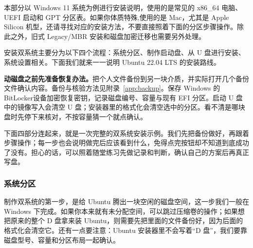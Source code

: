 本部分以 Windows 11 系统为例进行安装说明，使用的是常见的 x86\_64 电脑、UEFI 启动和 GPT 分区表。如果你体质特殊,使用的是 Mac，尤其是 Apple Silicon 机型，还请寻找对应的安装方法，不要直接照着下面的分区步骤操作。除此之外，旧式 Legacy/MBR 安装和磁盘加密迁移也需要另外处理。

安装双系统主要分为以下四个流程：系统分区、制作启动盘、从 U 盘进行安装、系统设置相关。下面我们就来一一说明 Ubuntu 22.04 LTS 的安装路线。

\begin{note}
\textbf{动磁盘之前先准备恢复办法。}把个人文件备份到另一块介质，并实际打开几个备份文件确认内容。备份与核验方法见附录~\ref{app:backup}。保存 Windows 的 BitLocker设备加密恢复密钥，记录磁盘编号、容量与现有 EFI 分区。启动 U 盘中的镜像写入会清空 U 盘；安装器里的格式化会清空选中的分区。看不清是哪块盘时先停下来核对，不按容量猜一个就点确认。
\end{note}

下面四部分连起来，就是一次完整的双系统安装示例。我们先把备份做好，再跟着步骤操作；每一步也会说明做完后应该看到什么，免得点完按钮却不知道到底成功了没有。担心的话，可以照着随堂练习先做记录和判断，确认自己的方案后再真正写盘。

\subsubsection{系统分区}
\label{sec:ubuntu-partition}
制作双系统的第一步，是给 Ubuntu 腾出一块空闲的磁盘空间，这一步我们一般在 Windows 下完成。如果你本来就有未分配空间，可以跳过压缩卷的操作；如果想把原来的整个 D 盘拿来装 Ubuntu，则需要先把里面的文件备份好，因为后面的格式化会清空它。还有一点要注意：Ubuntu 安装器里不会写着“D 盘”，我们要靠磁盘型号、容量和分区布局一起确认。

